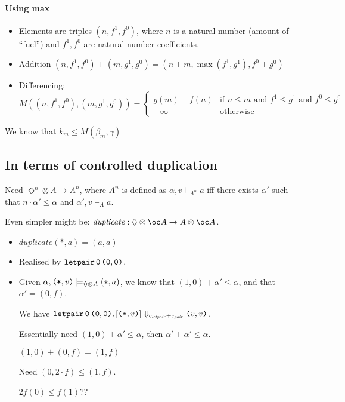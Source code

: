 \documentclass{workingnote}
\begin{document}
\paragraph{Using max}
\begin{itemize}
\item Elements are triples $(n, f^1, f^0)$, where $n$ is a natural
  number (amount of ``fuel'') and $f^1, f^0$ are natural number
  coefficients.
\item Addition $(n,f^1,f^0) + (m,g^1,g^0) = (n+m, \max(f^1,g^1), f^0+g^0)$
\item Differencing:
  \begin{displaymath}
    M((n,f^1,f^0),(m,g^1,g^0)) = \left\{\begin{array}{ll} g(m) - f(n) & \textrm{if }n \leq m\textrm{ and }f^1 \leq g^1\textrm{ and }f^0 \leq g^0
                                          \\
                                          -\infty & \textrm{otherwise} \end{array}\right.
  \end{displaymath}
\end{itemize}


We know that $k_m \leq M(\beta_m, \gamma)$

\subsection{In terms of controlled duplication}

Need $\Diamond^n \otimes A \to A^n$, where $A^n$ is defined as
$\alpha, v \models_{A^n} a$ iff there exists $\alpha'$ such that
$n \cdot \alpha' \leq \alpha$ and $\alpha', v \models_A a$.

Even simpler might be:
$\mathit{duplicate} : \Diamond \otimes \oc A \to A \otimes \oc A$.
\begin{itemize}
\item $\mathit{duplicate}(*,a) = (a,a)$
\item Realised by $\texttt{letpair}\,\texttt{0}\,\texttt{(}\texttt{0},\texttt{0}\texttt{)}$.
\item Given
  $\alpha, \texttt{(}\texttt{*},v\texttt{)} \models_{\Diamond \otimes A} (*,a)$, we know
  that $(1,0) + \alpha' \leq \alpha$, and that $\alpha' = (0,f)$.

  We have
  $\texttt{letpair}\,\texttt{0}\,\texttt{(}\texttt{0},\texttt{0}\texttt{)}, [\texttt{(}\texttt{*},v\texttt{)}]
  \Downarrow_{c_{\mathit{letpair}}+c_{\mathit{pair}}} \texttt{(}v,v\texttt{)}$.

  Essentially need $(1,0) + \alpha' \leq \alpha$, then
  $\alpha' + \alpha' \leq \alpha$.

  $(1,0) + (0,f) = (1,f)$

  Need $(0,2\cdot f) \leq (1,f)$.

  $2f(0) \leq f(1)$??
\end{itemize}
\end{document}
